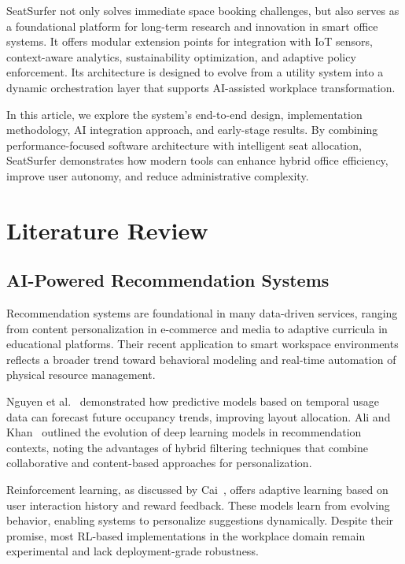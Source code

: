 \documentclass[onecolumn, 12pt]{IEEEtran}
\begin{document}
SeatSurfer not only solves immediate space booking challenges, but also serves as a foundational platform for long-term research and innovation in smart office systems. It offers modular extension points for integration with IoT sensors, context-aware analytics, sustainability optimization, and adaptive policy enforcement. Its architecture is designed to evolve from a utility system into a dynamic orchestration layer that supports AI-assisted workplace transformation.

In this article, we explore the system's end-to-end design, implementation methodology, AI integration approach, and early-stage results. By combining performance-focused software architecture with intelligent seat allocation, SeatSurfer demonstrates how modern tools can enhance hybrid office efficiency, improve user autonomy, and reduce administrative complexity.

\section{Literature Review}

\subsection{AI-Powered Recommendation Systems}

Recommendation systems are foundational in many data-driven services, ranging from content personalization in e-commerce and media to adaptive curricula in educational platforms. Their recent application to smart workspace environments reflects a broader trend toward behavioral modeling and real-time automation of physical resource management.

Nguyen et al.~\cite{nguyen2023predictive} demonstrated how predictive models based on temporal usage data can forecast future occupancy trends, improving layout allocation. Ali and Khan~\cite{ali2023survey} outlined the evolution of deep learning models in recommendation contexts, noting the advantages of hybrid filtering techniques that combine collaborative and content-based approaches for personalization.

Reinforcement learning, as discussed by Cai~\cite{cai2022rl}, offers adaptive learning based on user interaction history and reward feedback. These models learn from evolving behavior, enabling systems to personalize suggestions dynamically. Despite their promise, most RL-based implementations in the workplace domain remain experimental and lack deployment-grade robustness.
\end{document}

